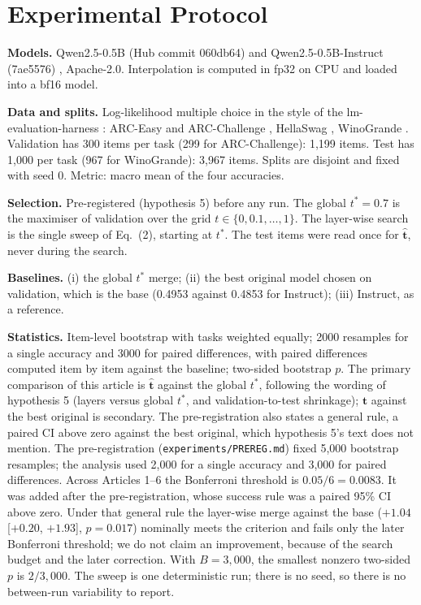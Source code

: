 \documentclass[conference]{IEEEtran}
\begin{document}
\section{Experimental Protocol}
\textbf{Models.} Qwen2.5-0.5B (Hub commit 060db64) and Qwen2.5-0.5B-Instruct (7ae5576) \cite{yang2024qwen25}, Apache-2.0. Interpolation is computed in fp32 on CPU and loaded into a bf16 model.

\textbf{Data and splits.} Log-likelihood multiple choice in the style of the lm-evaluation-harness \cite{gao2021harness}: ARC-Easy and ARC-Challenge \cite{clark2018arc}, HellaSwag \cite{zellers2019hellaswag}, WinoGrande \cite{sakaguchi2019winogrande}. Validation has 300 items per task (299 for ARC-Challenge): 1{,}199 items. Test has 1{,}000 per task (967 for WinoGrande): 3{,}967 items. Splits are disjoint and fixed with seed 0. Metric: macro mean of the four accuracies.

\textbf{Selection.} Pre-registered (hypothesis 5) before any run. The global $t^*=0.7$ is the maximiser of validation over the grid $t\in\{0,0.1,\dots,1\}$. The layer-wise search is the single sweep of Eq.~(2), starting at $t^*$. The test items were read once for $\hat{\mathbf t}$, never during the search.

\textbf{Baselines.} (i) the global $t^*$ merge; (ii) the best original model chosen on validation, which is the base (0.4953 against 0.4853 for Instruct); (iii) Instruct, as a reference.

\textbf{Statistics.} Item-level bootstrap with tasks weighted equally; 2000 resamples for a single accuracy and 3000 for paired differences, with paired differences computed item by item against the baseline; two-sided bootstrap $p$. The primary comparison of this article is $\hat{\mathbf t}$ against the global $t^*$, following the wording of hypothesis 5 (layers versus global $t^*$, and validation-to-test shrinkage); $\hat{\mathbf t}$ against the best original is secondary. The pre-registration also states a general rule, a paired CI above zero against the best original, which hypothesis 5's text does not mention. The pre-registration (\texttt{experiments/PREREG.md}) fixed 5{,}000 bootstrap resamples; the analysis used 2{,}000 for a single accuracy and 3{,}000 for paired differences. Across Articles 1--6 the Bonferroni threshold is $0.05/6=0.0083$. It was added after the pre-registration, whose success rule was a paired 95\% CI above zero. Under that general rule the layer-wise merge against the base ($+1.04$ [$+0.20$, $+1.93$], $p=0.017$) nominally meets the criterion and fails only the later Bonferroni threshold; we do not claim an improvement, because of the search budget and the later correction. With $B=3{,}000$, the smallest nonzero two-sided $p$ is $2/3{,}000$. The sweep is one deterministic run; there is no seed, so there is no between-run variability to report.
\end{document}
